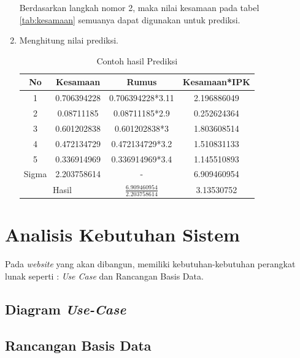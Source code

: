 \begin{enumerate}
    Berdasarkan langkah nomor 2, maka nilai kesamaan pada tabel \ref{tab:kesamaan} semuanya dapat digunakan untuk prediksi.
    
    \item Menghitung nilai prediksi.
    
    \begin{table}[H]
        \centering
        \begin{tabular}{|c|c|c|c|}
            \hline
            No & Kesamaan & Rumus & Kesamaan*IPK \\
            \hline
            1 & 0.706394228 & 0.706394228*3.11 & 2.196886049 \\
            \hline
            2 & 0.08711185 & 0.08711185*2.9 &  0.252624364 \\
            \hline
            3 & 0.601202838 & 0.601202838*3 & 1.803608514 \\
            \hline
            4 & 0.472134729 & 0.472134729*3.2 & 1.510831133 \\
            \hline
            5 & 0.336914969 & 0.336914969*3.4 & 1.145510893 \\
            \hline
            Sigma & 2.203758614 & - & 6.909460954 \\
            \hline
            \multicolumn{2}{|c|}{Hasil} & $\frac{6.909460954}{2.203758614}$ & 3.13530752\\
            \hline
        \end{tabular}
        \caption{Contoh hasil Prediksi}
        \label{tab:prediksi}
    \end{table}
\end{enumerate}

\section{Analisis Kebutuhan Sistem}
\label{analisis kebutuhan sistem}
Pada \textit{website} yang akan dibangun, memiliki kebutuhan-kebutuhan perangkat lunak seperti : \textit{Use Case} dan Rancangan Basis Data.

\subsection{Diagram \textit{Use-Case}}

\subsection{Rancangan Basis Data}
\label{rancangan basis data}

